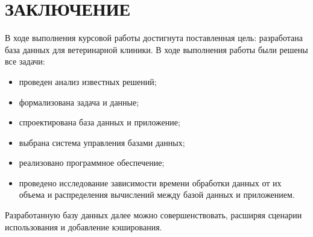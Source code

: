 \section*{ЗАКЛЮЧЕНИЕ}

В ходе выполнения курсовой работы достигнута поставленная цель: разработана база данных для ветеринарной клиники.
В ходе выполнения работы были решены все задачи:
\begin{itemize}[label*=---]
	\item проведен анализ известных решений;
	\item формализована задача и данные;
	\item спроектирована база данных и приложение;
	\item выбрана система управления базами данных;
	\item реализовано программное обеспечение;
	\item проведено исследование зависимости времени обработки данных от их объема и распределения вычислений между базой данных и приложением.
\end{itemize}

Разработанную базу данных далее можно совершенствовать, расширяя сценарии использования и добавление кэширования.